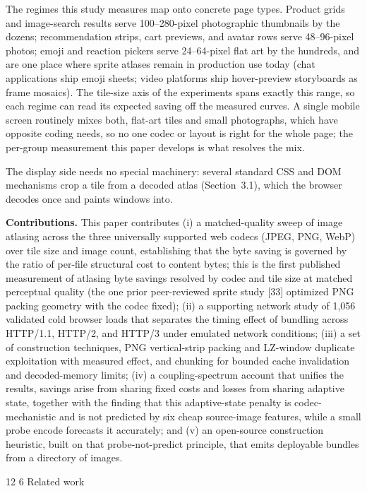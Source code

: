 \documentclass[3p,twocolumn]{elsarticle}
\makeatletter
\renewcommand\section{\@startsection{section}{1}{\z@}%
           {12\p@ \@plus 3\p@ \@minus 4\p@}%
           {6\p@ \@plus 2\p@ \@minus 2\p@}%
           {\normalsize\bfseries\boldmath}}
\makeatother
\begin{document}
The regimes this study measures map onto concrete page types. Product
grids and image-search results serve 100--280-pixel photographic
thumbnails by the dozens; recommendation strips, cart previews, and
avatar rows serve 48--96-pixel photos; emoji and reaction pickers serve
24--64-pixel flat art by the hundreds, and are one place where sprite
atlases remain in production use today (chat applications ship emoji
sheets; video platforms ship hover-preview storyboards as frame
mosaics). The tile-size axis of the experiments spans exactly this
range, so each regime can read its expected saving off the measured
curves. A single mobile screen routinely mixes both, flat-art tiles and
small photographs, which have opposite coding needs, so no one codec or
layout is right for the whole page; the per-group measurement this paper
develops is what resolves the mix.

The display side needs no special machinery: several standard CSS and
DOM mechanisms crop a tile from a decoded atlas (Section~3.1), which the
browser decodes once and paints windows into.

\textbf{Contributions.} This paper contributes (i) a matched-quality
sweep of image atlasing across the three universally supported web
codecs (JPEG, PNG, WebP) over tile size and image count, establishing
that the byte saving is governed by the ratio of per-file structural
cost to content bytes; this is the first published measurement of
atlasing byte savings resolved by codec and tile size at matched
perceptual quality (the one prior peer-reviewed sprite study [33]
optimized PNG packing geometry with the codec fixed); (ii) a supporting
network study of 1,056 validated cold browser loads that separates the
timing effect of bundling across HTTP/1.1, HTTP/2, and HTTP/3 under
emulated network conditions; (iii) a set of construction techniques, PNG
vertical-strip packing and LZ-window duplicate exploitation with
measured effect, and chunking for bounded cache invalidation and
decoded-memory limits; (iv) a coupling-spectrum account that unifies the
results, savings arise from sharing fixed costs and losses from sharing
adaptive state, together with the finding that this adaptive-state
penalty is codec-mechanistic and is not predicted by six cheap
source-image features, while a small probe encode forecasts it
accurately; and (v) an open-source construction heuristic, built on that
probe-not-predict principle, that emits deployable bundles from a
directory of images.

\section{Related work}
\end{document}

